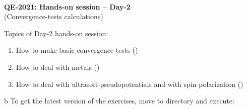 \documentclass[landscape]{foils}
\begin{document}

\blue
~\\
\vspace*{4cm}
\MyLogo{~}
\vspace{5em}
\begin{center}
  {\burgundy\LARGE\bf QE-2021: Hands-on session -- Day-2}\\[2em]
  {\burgundy\LARGE (Convergence-tests calculations)}
  ~\\[1.5em]
\end{center}

Topics of Day-2 hands-on session:
\begin{enumerate}
\item How to make basic convergence tests ()
\item How to deal with metals ()
\item How to deal with ultrasoft pseudopotentials and with spin polarization
  ()
\end{enumerate}
b
To get the latest version of the exercises, move to  directory and execute:\\[0.5em]
    
\end{document}
